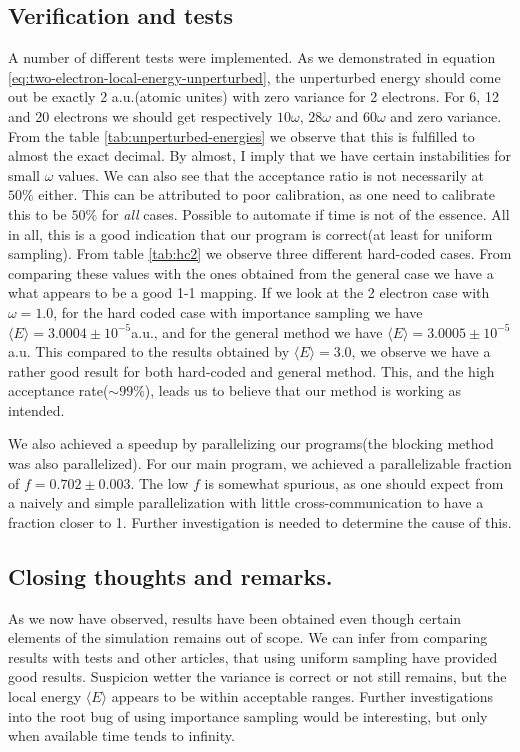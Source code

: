 \documentclass[11pt]{article}
\begin{document}
\subsection{Verification and tests}
A number of different tests were implemented. As we demonstrated in equation \eqref{eq:two-electron-local-energy-unperturbed}, the unperturbed energy should come out be exactly 2 a.u.(atomic unites) with zero variance for 2 electrons. For 6, 12 and 20 electrons we should get respectively $10\omega$, $28\omega$ and $60\omega$ and zero variance. From the table \ref{tab:unperturbed-energies} we observe that this is fulfilled to almost the exact decimal. By almost, I imply that we have certain instabilities for small $\omega$ values. We can also see that the acceptance ratio is not necessarily at $50\%$ either. This can be attributed to poor calibration, as one need to calibrate this to be $50\%$ for \textit{all} cases. Possible to automate if time is not of the essence. All in all, this is a good indication that our program is correct(at least for uniform sampling).
From table \ref{tab:hc2} we observe three different hard-coded cases. From comparing these values with the ones obtained from the general case we have a what appears to be a good 1-1 mapping. If we look at the 2 electron case with $\omega=1.0$, for the hard coded case with importance sampling we have $\langle E\rangle=3.0004\pm10^{-5}$a.u., and for the general method we have $\langle E\rangle=3.0005\pm10^{-5}$a.u. This compared to the results obtained by \citet{PhysRevB.84.115302} $\langle E \rangle = 3.0$, we observe we have a rather good result for both hard-coded and general method. This, and the high acceptance rate($\sim 99\%$), leads us to believe that our method is working as intended.

We also achieved a speedup by parallelizing our programs(the blocking method was also parallelized). For our main program, we achieved a parallelizable fraction of $f=0.702\pm 0.003$. The low $f$ is somewhat spurious, as one should expect from a naively and simple parallelization with little cross-communication to have a fraction closer to 1. Further investigation is needed to determine the cause of this.

\subsection{Closing thoughts and remarks.}
As we now have observed, results have been obtained even though certain elements of the simulation remains out of scope. We can infer from comparing results with tests and other articles\cite{PhysRevB.84.115302}, that using uniform sampling have provided good results. Suspicion wetter the variance is correct or not still remains, but the local energy $\langle E\rangle$ appears to be within acceptable ranges. Further investigations into the root bug of using importance sampling would be interesting, but only when available time tends to infinity.
\end{document}
